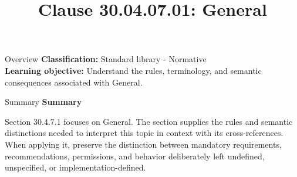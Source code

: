 \documentclass[10pt,letterpaper]{article}
\title{Clause 30.04.07.01: General}
\author{}
\date{}
\begin{document}
\maketitle
\begin{CornellOverviewBox}{Overview}
\textbf{Classification:} Standard library - Normative\\[2pt]
\textbf{Learning objective:} Understand the rules, terminology, and semantic consequences associated with General.
\end{CornellOverviewBox}\begin{CornellSummaryBox}{Summary}
{\sffamily\bfseries\color{Accent} Summary}\par\vspace{3pt}Section 30.4.7.1 focuses on General. The section supplies the rules and semantic distinctions needed to interpret this topic in context with its cross-references. When applying it, preserve the distinction between mandatory requirements, recommendations, permissions, and behavior deliberately left undefined, unspecified, or implementation-defined.
\end{CornellSummaryBox}
\end{document}
